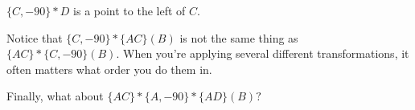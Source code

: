 


$\{C,-90\} * D$ is a point to the left of $C.$

Notice that $\{C,-90\} * \{AC\} (B)$ is not the same thing as $\{AC\} * \{C,-90\} (B).$ When you're applying several different transformations, it often matters what order you do them in.

Finally, what about $\{AC\} * \{A,-90\} * \{AD\} (B)?$


















